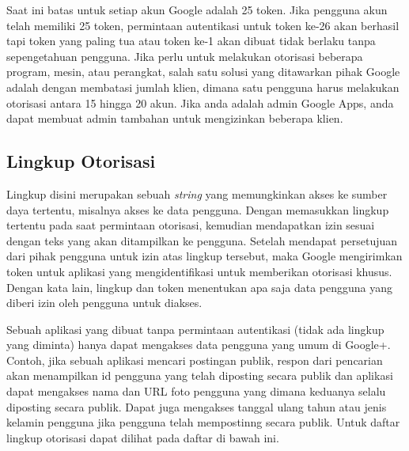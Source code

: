 Saat ini batas untuk setiap akun Google adalah 25 token. Jika pengguna akun telah memiliki 25 token, permintaan autentikasi untuk token ke-26 akan berhasil tapi token yang paling tua atau token ke-1 akan dibuat tidak berlaku tanpa sepengetahuan pengguna. Jika perlu untuk melakukan otorisasi beberapa program, mesin, atau perangkat, salah satu solusi yang ditawarkan pihak Google adalah dengan membatasi jumlah klien, dimana satu pengguna harus melakukan otorisasi antara 15 hingga 20 akun. Jika anda adalah admin Google Apps, anda dapat membuat admin tambahan untuk mengizinkan beberapa klien.

\subsection{Lingkup Otorisasi \cite{Scope:2013}}
Lingkup disini merupakan sebuah {\it string} yang memungkinkan akses ke sumber daya tertentu, misalnya akses ke data pengguna. Dengan memasukkan lingkup tertentu pada saat permintaan otorisasi, kemudian mendapatkan izin sesuai dengan teks yang akan ditampilkan ke pengguna. Setelah mendapat persetujuan dari pihak pengguna untuk izin atas lingkup tersebut, maka Google mengirimkan token untuk aplikasi yang mengidentifikasi untuk memberikan otorisasi khusus. Dengan kata lain, lingkup dan token menentukan apa saja data pengguna yang diberi izin oleh pengguna untuk diakses.

Sebuah aplikasi yang dibuat tanpa permintaan autentikasi (tidak ada lingkup yang diminta) hanya dapat mengakses data pengguna yang umum di Google+. Contoh, jika sebuah aplikasi mencari postingan publik, respon dari pencarian akan menampilkan id pengguna yang telah diposting secara publik dan aplikasi dapat mengakses nama dan URL foto pengguna yang dimana keduanya selalu diposting secara publik. Dapat juga mengakses tanggal ulang tahun atau jenis kelamin pengguna jika pengguna telah mempostinng secara publik. Untuk daftar lingkup otorisasi dapat dilihat pada daftar di bawah ini.

